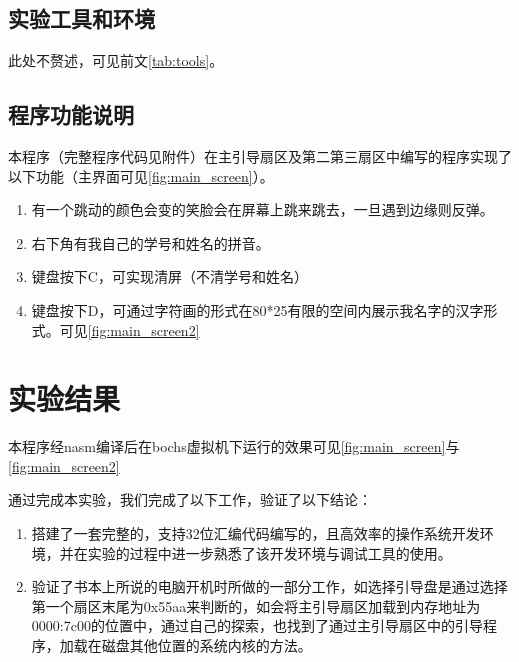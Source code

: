 \documentclass[forprint]{WHUBachelor}
\begin{document}
\section{实验工具和环境}
此处不赘述，可见前文\autoref{tab:tools}。

\section{程序功能说明}

本程序（完整程序代码见附件）在主引导扇区及第二第三扇区中编写的程序实现了以下功能（主界面可见\autoref{fig:main_screen}）。

\begin{enumerate}
  \item 有一个跳动的颜色会变的笑脸会在屏幕上跳来跳去，一旦遇到边缘则反弹。
  \item 右下角有我自己的学号和姓名的拼音。
  \item 键盘按下C，可实现清屏（不清学号和姓名）
  \item 键盘按下D，可通过字符画的形式在80*25有限的空间内展示我名字的汉字形式。可见\autoref{fig:main_screen2}
\end{enumerate}



\chapter{实验结果}
本程序经nasm编译后在bochs虚拟机下运行的效果可见\autoref{fig:main_screen}与\autoref{fig:main_screen2}

通过完成本实验，我们完成了以下工作，验证了以下结论：

\begin{enumerate}
  \item 搭建了一套完整的，支持32位汇编代码编写的，且高效率的操作系统开发环境，并在实验的过程中进一步熟悉了该开发环境与调试工具的使用。
  \item 验证了书本上所说的电脑开机时所做的一部分工作，如选择引导盘是通过选择第一个扇区末尾为0x55aa来判断的，如会将主引导扇区加载到内存地址为0000:7c00的位置中，通过自己的探索，也找到了通过主引导扇区中的引导程序，加载在磁盘其他位置的系统内核的方法。
\end{enumerate}
\end{document}
